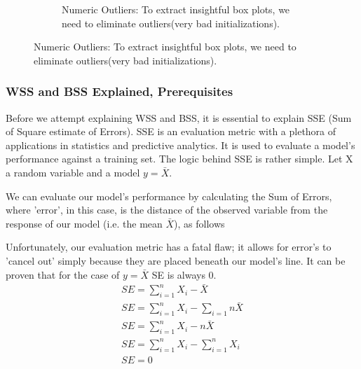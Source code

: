 \documentclass[11pt]{article}
\begin{document}
\begin{figure}[H]
\begin{subfigure}{0.35\textwidth}
					\caption{Numeric Outliers: To extract insightful box plots, we need to eliminate outliers(very bad initializations).}
					\label{fig:first}
				\end{subfigure}
					\label{fig:figures}
			\end{figure}
			\fi
			
			\subsubsection*{WSS and BSS Explained, Prerequisites}
				Before we attempt explaining WSS and BSS, it is essential to explain SSE (Sum of Square estimate of Errors). SSE is an evaluation metric with a plethora of applications in statistics and predictive analytics\cite{sse}. It is used to evaluate a model's performance against a training set. The logic behind SSE is rather simple. Let X a random variable and a model $y=\bar{X}$.

				We can evaluate our model's performance by calculating the Sum of Errors, where 'error', in this case, is the distance of the observed variable from the response of our model (i.e. the mean $\bar{X}$), as follows

				Unfortunately, our evaluation metric has a fatal flaw; it allows for error's to 'cancel out' simply because they are placed beneath our model's line. It can be proven that for the case of $y=\bar{X}$ SE is always 0.
				\iffalse
				\begin{align}
					SE = \sum_{i=1}^{n}{X_i-\bar{X}} \\
					SE = \sum_{i=1}^{n}{X_i} - \sum_{i=1}{n}{\bar{X}} \\
					SE = \sum_{i=1}^{n}{X_i} - n\bar{X} \\
					SE = \sum_{i=1}^{n}{X_i} - \sum_{i=1}^{n}{X_i} \\
					SE = 0 \\
				\end{align}
\end{document}
